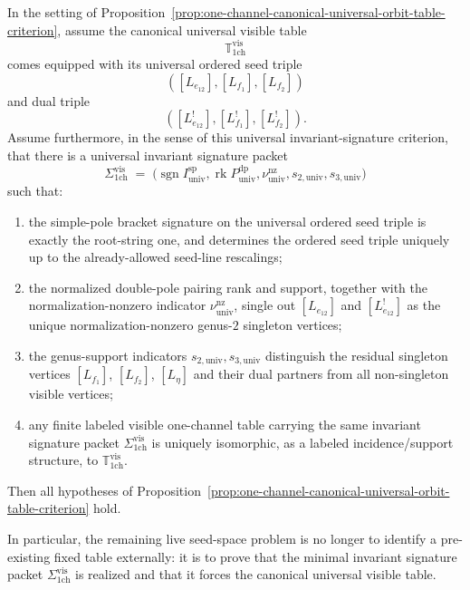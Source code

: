 \begin{proposition}\label{prop:one-channel-universal-invariant-signature-criterion}
In the setting of
Proposition~\textup{\ref{prop:one-channel-canonical-universal-orbit-table-criterion}},
assume the canonical universal visible table
\[
\mathbb{T}_{\mathrm{1ch}}^{\mathrm{vis}}
\]
comes equipped with its universal ordered seed triple
\[
([L_{e_{12}}],[L_{f_1}],[L_{f_2}])
\]
and dual triple
\[
([L_{e_{12}}^!],[L_{f_1}^!],[L_{f_2}^!]).
\]
Assume furthermore, in the sense of this universal invariant-signature
criterion, that there is a universal invariant signature packet
\[
\Sigma_{\mathrm{1ch}}^{\mathrm{vis}}
\;=\;
\bigl(
\operatorname{sgn} I^{\mathrm{sp}}_{\mathrm{univ}},
\operatorname{rk} P^{\mathrm{dp}}_{\mathrm{univ}},
\nu^{\mathrm{nz}}_{\mathrm{univ}},
s_{2,\mathrm{univ}},
s_{3,\mathrm{univ}}
\bigr)
\]
such that:
\begin{enumerate}[label=\textup{(\roman*)}]
\item the simple-pole bracket signature on the universal ordered seed
  triple is exactly the root-string one, and determines the ordered
  seed triple uniquely up to the already-allowed seed-line rescalings;
\item the normalized double-pole pairing rank and support, together
  with the normalization-nonzero indicator
  $\nu^{\mathrm{nz}}_{\mathrm{univ}}$, single out
  $[L_{e_{12}}]$ and $[L_{e_{12}}^!]$ as the unique normalization-nonzero
  genus-$2$ singleton vertices;
\item the genus-support indicators
  $s_{2,\mathrm{univ}}, s_{3,\mathrm{univ}}$
  distinguish the residual singleton vertices
  $[L_{f_1}]$, $[L_{f_2}]$, $[L_{\eta}]$ and their dual partners from all
  non-singleton visible vertices;
\item any finite labeled visible one-channel table carrying the same
  invariant signature packet
  $\Sigma_{\mathrm{1ch}}^{\mathrm{vis}}$
  is uniquely isomorphic, as a labeled incidence/support structure, to
  $\mathbb{T}_{\mathrm{1ch}}^{\mathrm{vis}}$.
\end{enumerate}
Then all hypotheses of
Proposition~\ref{prop:one-channel-canonical-universal-orbit-table-criterion}
hold.

In particular, the remaining live seed-space problem is no longer to
identify a pre-existing fixed table externally: it is to prove that the
minimal invariant signature packet
$\Sigma_{\mathrm{1ch}}^{\mathrm{vis}}$
is realized and that it forces the canonical universal visible table.
\end{proposition}

